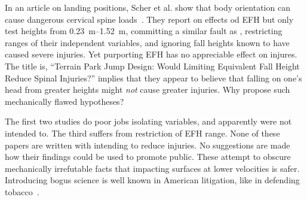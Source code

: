 \documentclass[smallextended]{svjour3}       %
\begin{document}

In an article on landing positions, Scher et al. show that body orientation can cause dangerous cervical spine loads~\cite{Scher2015}. They report
on effects od EFH but only test heights from
\SIrange{0.23}{1.52}{\meter}, committing a similar fault as
\cite{Shealy2010}, restricting ranges of their independent variables, and ignoring fall heights known to have caused
severe injuries. Yet purporting EFH has no
appreciable effect on injures. The title is, ``Terrain Park Jump
Design: Would Limiting Equivalent Fall Height Reduce Spinal Injuries?'' implies
that they appear to believe that falling on one's head from greater heights might \emph{not} cause greater injuries.
Why propose such mechanically flawed hypotheses?

The first two studies do poor jobs isolating variables, and apparently were
not intended to. The third suffers from restriction of EFH range. None of these papers
are written with intending to reduce injuries. No suggestions are made how their findings could be used to promote public. These attempt to obscure  mechanically irrefutable facts that impacting  surfaces at  lower velocities is safer. Introducing bogus science is well known in American litigation, like in defending tobacco~\cite{Oreskes2010}.
\end{document}

